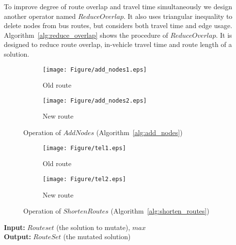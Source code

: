 To improve degree of route overlap and travel time simultaneously we design another operator named $ReduceOverlap$. It also uses triangular inequality to delete nodes from bus routes, but considers both travel time and edge usage.  Algorithm~\ref{alg:reduce_overlap} shows the procedure of $ReduceOverlap$. It is designed to reduce route overlap, in-vehicle travel time and route length of a solution.


\begin{figure} [!htbp]
	\centering
	\begin{subfigure}{0.6\textwidth}
		\texttt{[image: Figure/add\_nodes1.eps]}
		\caption{Old route}
	\end{subfigure}
	\hspace*{0.0cm} %
	\begin{subfigure}{0.6\textwidth}
		\texttt{[image: Figure/add\_nodes2.eps]}
		\caption{New route}
	\end{subfigure}
	\caption{Operation of $AddNodes$ (Algorithm~\ref{alg:add_nodes})} \label{fig:add_nodes}
\end{figure}

\begin{figure} [!htbp]
	\centering
	\begin{subfigure}{0.5\textwidth}
		\texttt{[image: Figure/tel1.eps]}
		\caption{Old route}
	\end{subfigure}
	\hspace*{0.0cm} %
	\begin{subfigure}{0.5\textwidth}
		\texttt{[image: Figure/tel2.eps]}
		\caption{New route}
	\end{subfigure}
	\caption{Operation of $ShortenRoutes$ (Algorithm~\ref{alg:shorten_routes})} \label{fig:shorten_routes}
\end{figure}

\begin{algorithm}[!htbp]
	\caption{$ AddNodes(Routeset, max ) $}
	\textbf{Input:} $Routeset$ (the solution to mutate), $max$\\
	\textbf{Output:} $RouteSet$ (the mutated solution)
	\begin{algorithmic}[1]\label{alg:add_nodes}
		 
		\REPEAT
		\ENDIF
	\end{algorithmic}
\end{algorithm}

